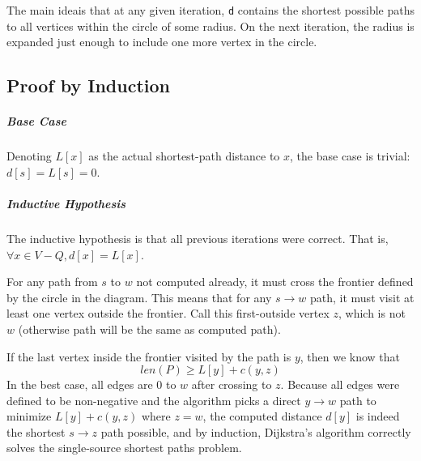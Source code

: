\documentclass[11pt]{article}
\begin{document}
	\begin{center}
	\end{center}
	The main ideais that at any given iteration, \verb|d| contains the shortest possible paths to all vertices within the circle of some radius. On the next iteration, the radius is expanded just enough to include one more vertex in the circle.
	
	\subsection{Proof by Induction}
		\subparagraph{Base Case} Denoting $L[x]$ as the actual shortest-path distance to $x$, the base case is trivial: $d[s] = L[s] = 0$. 
		
		\subparagraph{Inductive Hypothesis} The inductive hypothesis is that all previous iterations were correct. That is, $\forall x \in V-Q, d[x] = L[x]$.
		\[\]
		
		For any path from $s$ to $w$ not computed already, it must cross the frontier defined by the circle in the diagram. This means that for any $s\rightarrow w$ path, it must visit at least one vertex outside the frontier. Call this first-outside vertex $z$, which is not $w$ (otherwise path will be the same as computed path).
		
		If the last vertex inside the frontier visited by the path is $y$, then we know that
		\begin{equation}
			len(P) \geq L[y] + c(y, z)
		\end{equation}
		In the best case, all edges are 0 to $w$ after crossing to $z$. Because all edges were defined to be non-negative and the algorithm picks a direct $y \rightarrow w$ path to minimize $L[y] + c(y, z)$ where $z = w$, the computed distance $d[y]$ is indeed the shortest $s \rightarrow z$ path possible, and by induction, Dijkstra's algorithm correctly solves the single-source shortest paths problem.


\end{document}
